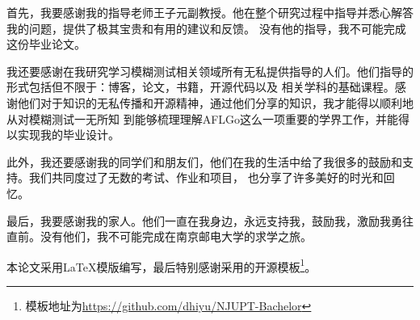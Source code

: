 \documentclass[bachelor]{njupthesis}
\begin{document}
首先，我要感谢我的指导老师王子元副教授。他在整个研究过程中指导并悉心解答我的问题，提供了极其宝贵和有用的建议和反馈。
没有他的指导，我不可能完成这份毕业论文。

我还要感谢在我研究学习模糊测试相关领域所有无私提供指导的人们。他们指导的形式包括但不限于：博客，论文，书籍，开源代码以及
相关学科的基础课程。感谢他们对于知识的无私传播和开源精神，通过他们分享的知识，我才能得以顺利地从对模糊测试一无所知
到能够梳理理解AFLGo这么一项重要的学界工作，并能得以实现我的毕业设计。

此外，我还要感谢我的同学们和朋友们，他们在我的生活中给了我很多的鼓励和支持。我们共同度过了无数的考试、作业和项目，
也分享了许多美好的时光和回忆。

最后，我要感谢我的家人。他们一直在我身边，永远支持我，鼓励我，激励我勇往直前。没有他们，我不可能完成在南京邮电大学的求学之旅。

本论文采用\LaTeX 模版编写，最后特别感谢采用的开源模板\footnote{模板地址为\url{https://github.com/dhiyu/NJUPT-Bachelor}}。

\thesisreference
\end{document}

